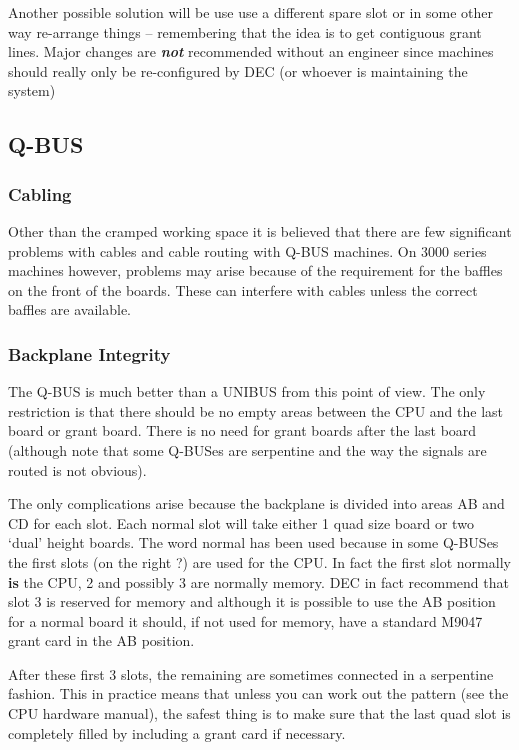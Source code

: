 Another possible solution will be use use a different spare slot 
or in some other way re-arrange things -- remembering that the idea is to 
get contiguous grant lines.
Major changes are {\bf \it not} recommended without an engineer since
machines should really only be re-configured by DEC (or whoever is maintaining
the system)


\subsection{Q-BUS}

\subsubsection{Cabling}

Other than the cramped working space it is believed that there are few
 significant problems with cables and cable routing with Q-BUS machines.
On 3000 series machines however, problems may arise because of the 
requirement for the baffles on the front of the boards.
These can interfere with cables unless the correct baffles are available.

\subsubsection{Backplane Integrity}

The Q-BUS is much better than a UNIBUS from this point of view.
 The only restriction is that there should be no empty areas between the
 CPU and the last board or grant board.
There is no need for grant boards after the last board (although note that
some Q-BUSes are serpentine and the way the signals are routed is not
obvious).

The only complications arise because the backplane is divided into areas
AB and CD for each slot.
Each normal slot will take either 1 quad size board or two `dual' height
boards.
The word normal has been used because in some Q-BUSes the first slots 
(on the right ?) are used for the CPU.
In fact the first slot normally {\bf is} the CPU, 2 and possibly 3 are
normally memory.
 DEC in fact recommend that slot 3 is reserved for memory and although 
 it is possible to use the AB position for a normal board it should, if
 not used for memory, have a standard M9047 grant card in the AB position.
 
 After these first 3 slots, the remaining are sometimes connected
 in a serpentine fashion.
 This in practice means that unless you can work 
 out the pattern (see the CPU hardware manual), the safest thing is to
make sure that the last quad slot is
 completely filled by including a grant card if necessary.

